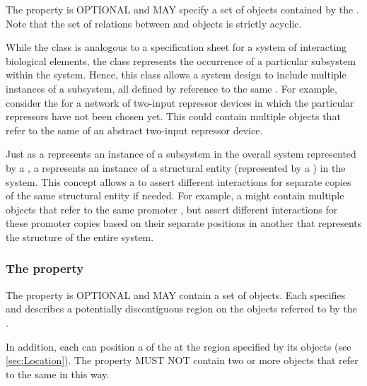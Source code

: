 The  property is OPTIONAL and MAY specify a set of  objects contained by the .
Note that the set of relations between  and  objects is strictly acyclic.

While the  class is analogous to a specification sheet for a system of interacting biological elements, the  class represents the occurrence of a particular subsystem within the system.
Hence, this class allows a system design to include multiple instances of a subsystem, all defined by reference to the same .
For example, consider the  for a network of two-input repressor devices in which the particular repressors have not been chosen yet. This  could contain multiple  objects that refer to the same  of an abstract two-input repressor device.

Just as a  represents an instance of a subsystem in the overall system represented by a  , a  represents an instance of a structural entity (represented by a ) in the system. This concept allows a  to assert different interactions for separate copies of the same structural entity if needed. For example, a  might contain multiple   objects that refer to the same promoter , but assert different interactions for these promoter copies based on their separate positions in another  that represents the structure of the entire system.



\subsubsection*{The  property}
\label{sec:feature}

The  property is OPTIONAL and MAY contain a set of  objects. Each  specifies and describes a potentially discontiguous region on the  objects referred to by the .

In addition, each  can  position a  of the  at the region specified by its  objects (see \ref{sec:Location}). 
The  property MUST NOT contain two or more  objects that refer to the same  in this way.

